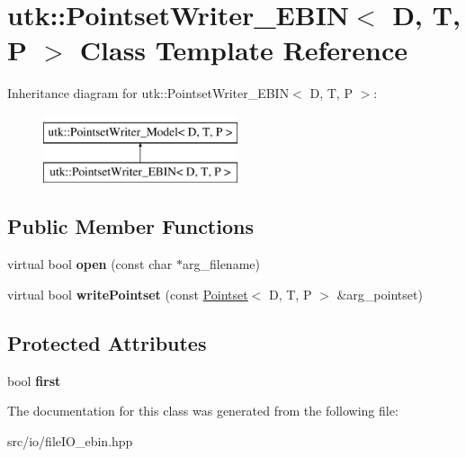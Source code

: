 \hypertarget{classutk_1_1PointsetWriter__EBIN}{\section{utk\-:\-:Pointset\-Writer\-\_\-\-E\-B\-I\-N$<$ D, T, P $>$ Class Template Reference}
\label{classutk_1_1PointsetWriter__EBIN}
}
Inheritance diagram for utk\-:\-:Pointset\-Writer\-\_\-\-E\-B\-I\-N$<$ D, T, P $>$\-:\begin{figure}[H]
\begin{center}
\leavevmode
\includegraphics[height=2.000000cm]{classutk_1_1PointsetWriter__EBIN}
\end{center}
\end{figure}
\subsection*{Public Member Functions}
\begin{DoxyCompactItemize}
\item 
\hypertarget{classutk_1_1PointsetWriter__EBIN_a7eb62d4fb692d26d4a173af4dc71e44d}{virtual bool {\bfseries open} (const char $\ast$arg\-\_\-filename)}\label{classutk_1_1PointsetWriter__EBIN_a7eb62d4fb692d26d4a173af4dc71e44d}

\item 
\hypertarget{classutk_1_1PointsetWriter__EBIN_aa3ce1827be886278e26aa607d3db2518}{virtual bool {\bfseries write\-Pointset} (const \hyperlink{classutk_1_1Pointset}{Pointset}$<$ D, T, P $>$ \&arg\-\_\-pointset)}\label{classutk_1_1PointsetWriter__EBIN_aa3ce1827be886278e26aa607d3db2518}

\end{DoxyCompactItemize}
\subsection*{Protected Attributes}
\begin{DoxyCompactItemize}
\item 
\hypertarget{classutk_1_1PointsetWriter__EBIN_ae65b0937ab5bf33b916b3d776a4b2204}{bool {\bfseries first}}\label{classutk_1_1PointsetWriter__EBIN_ae65b0937ab5bf33b916b3d776a4b2204}

\end{DoxyCompactItemize}


The documentation for this class was generated from the following file\-:\begin{DoxyCompactItemize}
\item 
src/io/file\-I\-O\-\_\-ebin.\-hpp\end{DoxyCompactItemize}
